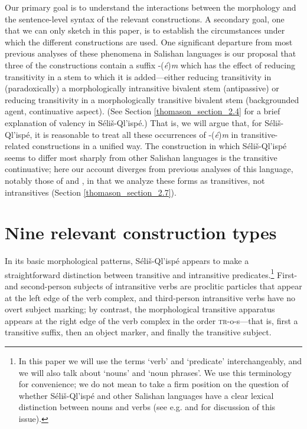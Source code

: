 \documentclass[output=paper,colorlinks,citecolor=brown]{langscibook}
\begin{document}
  Our primary goal is to understand the interactions between the
  morphology and the sentence-level syntax of the relevant
  constructions.  A secondary goal, one that we can only sketch in
  this paper, is to establish the circumstances under which the
  different constructions are used.  One significant departure from
  most previous analyses of these phenomena in Salishan languages is
  our proposal that three of the constructions contain a suffix
  -(\emph{\'e})\emph{m} which has the effect of reducing transitivity
  in a stem to which it is added---either reducing transitivity in
  (paradoxically) a morphologically intransitive bivalent stem
  (antipassive) or reducing transitivity in a morphologically
  transitive bivalent stem (backgrounded agent, continuative aspect).
  (See Section \ref{thomason_section_2.4} for a brief explanation of valency in
  S\'eli\v{s}-Ql'isp\'e.) That is, we will argue that, for
  S\'eli\v{s}-Ql'isp\'e, it is reasonable to treat all these
  occurrences of -(\emph{\'e})\emph{m} in transitive-related
  constructions in a unified way.  The construction in which
  S\'eli\v{s}-Ql'isp\'e seems to differ most sharply from other
  Salishan languages is the transitive continuative; here our account
  diverges from previous analyses of this language, notably those of
  \citet{Kroeber:1999} and \citet{Vogt:1940}, in
  that we analyze these
  forms as transitives, not intransitives (Section \ref{thomason_section_2.7}).

\section{Nine relevant construction types}
\label{thomason_section_2}
In its basic morphological patterns, S\'eli\v{s}-Ql'isp\'e appears to
make a straightforward distinction between transitive and intransitive
predicates.\footnote{In this paper we will use the terms `verb' and
`predicate' interchangeably, and we will also talk about `nouns' and
`noun phrases'.  We use this terminology for convenience; we do not
mean to take a firm position on the question of whether
S\'eli\v{s}-Ql'isp\'e and other Salishan languages have a clear
lexical distinction between nouns and verbs (see e.g. \citealt{Kinkade:1983} and
\citealt{vanEijk&Hess:1986} for discussion of this issue).}  First- and
second-person subjects of intransitive verbs are proclitic particles
that appear at the left edge of the verb complex, and third-person
intransitive verbs have no overt subject marking; by contrast, the
morphological transitive apparatus appears at the right edge of the
verb complex in the order \textsc{tr}-o-s---that is, first a
transitive suffix, then an object marker, and finally the transitive
subject.
\end{document}
